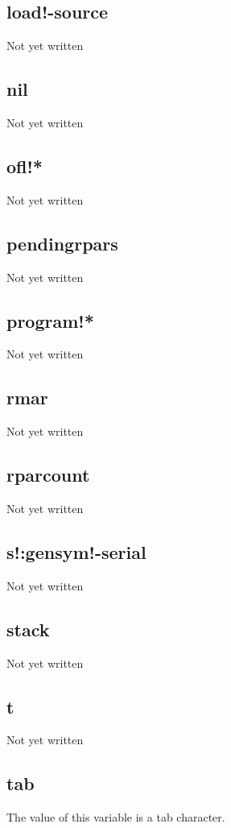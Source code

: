 \documentclass[a4paper,11pt]{article}
\begin{document}
\subsection{\ttfamily load!-source}
Not yet written

\subsection{\ttfamily nil}
Not yet written

\subsection{\ttfamily ofl!*}
Not yet written

\subsection{\ttfamily pendingrpars}
Not yet written

\subsection{\ttfamily program!*}
Not yet written

\subsection{\ttfamily rmar}
Not yet written

\subsection{\ttfamily rparcount}
Not yet written

\subsection{\ttfamily s!:gensym!-serial}
Not yet written

\subsection{\ttfamily stack}
Not yet written

\subsection{\ttfamily t}
Not yet written

\subsection{\ttfamily tab}
The value of this variable is a tab character.
\end{document}
